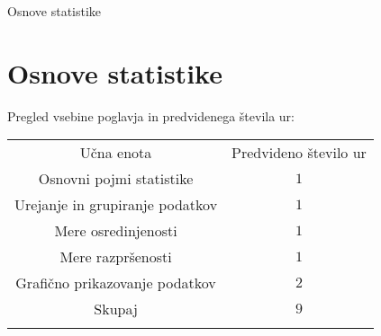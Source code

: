 \begin{priprava}{0}{}{}{Osnove statistike}{}{}

    \chapter{Osnove statistike}

    \Large{Pregled vsebine poglavja in predvidenega števila ur:}

    \begin{table}[H]
        \centering
        \begin{tabular}{||c|c||} 
        \hhline{|t:==:t|}
        \rowcolor[rgb]{0.843,0.718,0.718} 
        Učna enota  & Predvideno število ur   \\ 
        \hhline{|:==:|}
        Osnovni pojmi statistike & $1$    \\ 
        \hline
        Urejanje in grupiranje podatkov & $1$    \\ 
        \hline
        Mere osredinjenosti & $1$    \\ 
        \hline
        Mere razpršenosti & $1$     \\
        \hline
        Grafično prikazovanje podatkov & $2$     \\
        \hhline{|:==:|}
        Skupaj & $9$     \\
        \hhline{|b:==:b|}
        \end{tabular}
    \end{table}


\end{priprava}